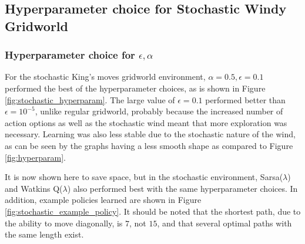 \documentclass{article}
\begin{document}
\subsection{Hyperparameter choice for Stochastic Windy Gridworld}

\subsubsection{Hyperparameter choice for $\epsilon, \alpha$}

For the stochastic King's moves gridworld environment, $\alpha = 0.5, \epsilon = 0.1$ performed the best of the hyperparameter choices, as is shown in Figure \ref{fig:stochastic_hyperparam}. The large value of $\epsilon = 0.1$ performed better than $\epsilon = 10^{-5}$, unlike regular gridworld, probably because the increased number of action options as well as the stochastic wind meant that more exploration was necessary. Learning was also less stable due to the stochastic nature of the wind, as can be seen by the graphs having a less smooth shape as compared to Figure \ref{fig:hyperparam}.

It is now shown here to save space, but in the stochastic environment, Sarsa($\lambda$) and Watkins Q($\lambda$) also performed best with the same hyperparameter choices. In addition, example policies learned are shown in Figure \ref{fig:stochastic_example_policy}. It should be noted that the shortest path, due to the ability to move diagonally, is $7$, not $15$, and that several optimal paths with the same length exist.
\end{document}

